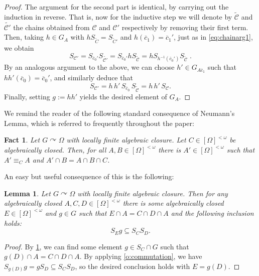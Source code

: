 \documentclass[10pt,a4paper]{amsart}
\def\acts{\curvearrowright}
\newcommand{\nn}[0]{S}
\newcommand{\C}[0]{\mathcal{C}}
\newcommand{\fps}[1]{[#1]^{<\omega}}
\theoremstyle{plain}
\newtheorem{lemma}[theorem]{Lemma}
\newtheorem{fact}[theorem]{Fact}
\theoremstyle{remark}
\begin{document}
\begin{proof}
  {The argument for the second part is identical, by carrying out the induction in reverse. That is, now for the inductive step we will denote by $\tilde{\C}$ and $\tilde{\C'}$ the chains obtained from $\C$ and $\C'$ respectively by removing their first term. Then, taking $h\in G_A$ with $h \nn_{\tilde{C}}=\nn_{\tilde{C}'}$ and $h(\overline{c}_1)=\overline{c}_1'$, just as in \eqref{eq:chainarg1}, we obtain} 
  \begin{equation}
    \label{nn equality}	\nn_{\C'}=\nn_{\overline{c}_0'}\nn_{\widetilde{\C'}}=\nn_{\overline{c}_0'}h\nn_{\widetilde{\C}}=h\nn_{h^{-1}(\overline{c}_0')}\nn_{\widetilde{\C}}\;.  
    \end{equation}
{By an analogous argument to the above, we can choose $h'\in G_{A\overline{c}_1}$ such that $h h' (\overline{c}_0)=\overline{c}_0'$, and similarly deduce that} 
\begin{equation*}
    \nn_{\C'}
      = h\,h'\,\nn_{\overline{c}_0}\,\nn_{\widetilde{\C}}
      = h\,h'\,\nn_{\C}.
  \end{equation*}
   {Finally, setting $g := hh'$ yields the desired element of $G_A$.}
  
  \end{proof}
 

  
  
  We remind the reader of the following standard consequence of Neumann's Lemma, which is referred to frequently throughout the paper:  
  \begin{fact}
  	\label{f:neumann} {Let $G\acts\Omega$ with locally finite algebraic closure.} Let $C\in\fps{\Omega}$ be algebraically closed. Then, for all $A, B\in\fps{\Omega}$ there is $A'\in \fps{\Omega} $ such that $A'\equiv_C A$ and $A'\cap B= A\cap B\cap C$.  
  \end{fact}
  
  An easy but useful consequence of this is the following: 
  \begin{lemma}
 	\label{l:intersections} Let $G\acts\Omega$ with locally finite algebraic closure.
 	Then for any algebraically closed $A,C,D\in\fps{\Omega}$  there is some algebraically closed $E\in\fps{\Omega}$ and $g\in G$ such that $E\cap A=C\cap D\cap A$ and the following inclusion holds:
  \begin{equation*}
  	\nn_{E}g\subseteq \nn_{C}\nn_{D}.
  \end{equation*}
 \end{lemma}
 \begin{proof}
 	By \cref{f:neumann}, we can find some element $g\in \nn_{C}\cap G$ such that $g(D)\cap A=C\cap D\cap A$. By applying \cref{o:commutation}, we have $\nn_{g(D)}g=g\nn_{D}\subseteq\nn_{C}\nn_{D}$, so the desired conclusion holds with $E=g(D)$. 
 \end{proof}
 
\end{document}
